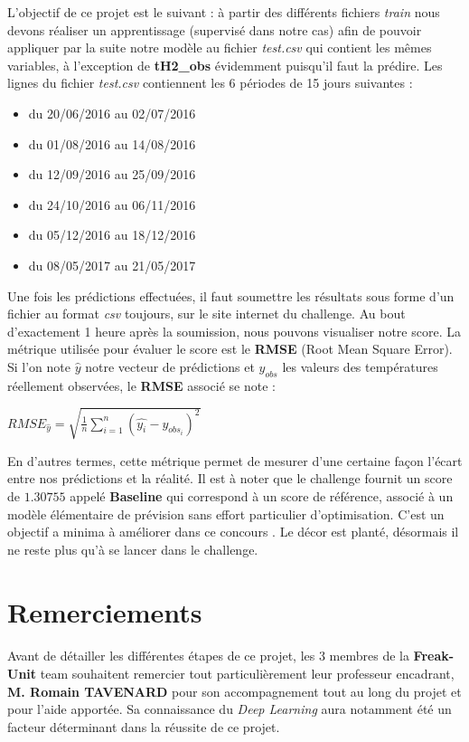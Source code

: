 \documentclass[14pt, openany]{article}
\begin{document}
L'objectif de ce projet est le suivant : à partir des différents fichiers \textit{train} nous devons réaliser un apprentissage (supervisé dans notre cas) afin de pouvoir appliquer par la suite notre modèle au fichier \textit{test.csv} qui contient les mêmes variables, à l'exception de \textbf{tH2\_obs} évidemment puisqu'il faut la prédire. Les lignes du fichier \textit{test.csv} contiennent les 6 périodes de 15 jours suivantes :
\begin{itemize}
\item du 20/06/2016 au 02/07/2016
\item du 01/08/2016 au 14/08/2016
\item du 12/09/2016 au 25/09/2016
\item du 24/10/2016 au 06/11/2016
\item du 05/12/2016 au 18/12/2016
\item du 08/05/2017 au 21/05/2017
\end{itemize}
Une fois les prédictions effectuées, il faut soumettre les résultats sous forme d'un fichier au format \textit{csv} toujours, sur le site internet du challenge. Au bout d'exactement 1 heure après la soumission, nous pouvons visualiser notre score. La métrique utilisée pour évaluer le score est le \textbf{RMSE} (Root Mean Square Error). Si l'on note $\hat{y}$ notre vecteur de prédictions et $y_{obs}$ les valeurs des températures réellement observées, le \textbf{RMSE} associé se note :\\
\begin{center}
$RMSE_{\hat{y}} = \sqrt{\frac{1}{n} \sum\limits_{i=1}^n (\hat{y_i}-y_{obs_i})^2}$
\end{center}
En d'autres termes, cette métrique permet de mesurer d'une certaine façon l'écart entre nos prédictions et la réalité. Il est à noter que le challenge fournit un score de $1.30755$ appelé \textbf{Baseline} qui correspond à un score de référence, associé à \og un modèle élémentaire de prévision sans effort particulier d'optimisation. C'est un objectif a minima à améliorer dans ce concours \fg{}. Le décor est planté, désormais il ne reste plus qu'à se lancer dans le challenge.
\section{Remerciements}
\paragraph{}
Avant de détailler les différentes étapes de ce projet, les 3 membres de la \textbf{Freak-Unit} team souhaitent remercier tout particulièrement leur professeur encadrant, \textbf{M. Romain TAVENARD} pour son accompagnement tout au long du projet et pour l'aide apportée. Sa connaissance du \textit{Deep Learning} aura notamment été un facteur déterminant dans la réussite de ce projet.
\end{document}
